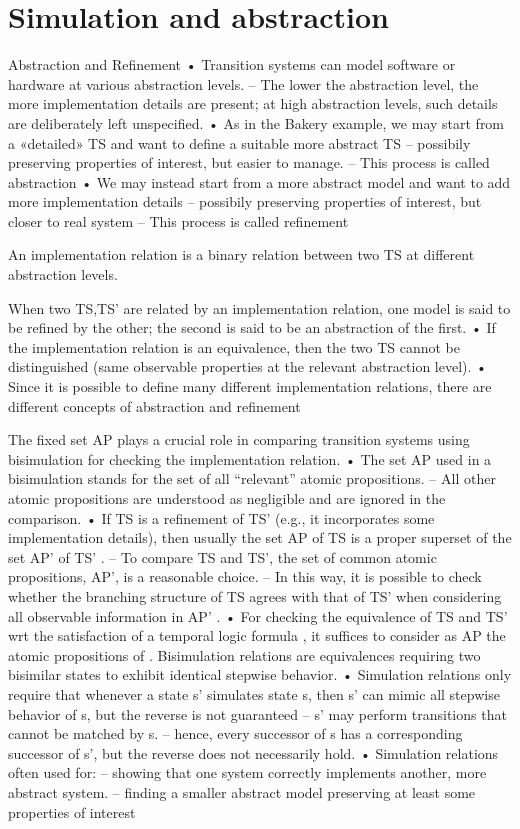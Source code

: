 \section{Simulation and abstraction}

Abstraction and Refinement
• Transition systems can model software or hardware at various abstraction levels.
– The lower the abstraction level, the more implementation details are present; at high
abstraction levels, such details are deliberately left unspecified.
• As in the Bakery example, we may start from a «detailed» TS and want to define
a suitable more abstract TS
– possibily preserving properties of interest, but easier to manage.
– This process is called abstraction
• We may instead start from a more abstract model and want to add more
implementation details
– possibily preserving properties of interest, but closer to real system
– This process is called refinement
\begin{definition}
    An implementation relation is a binary relation between two TS at different
abstraction levels. 
\end{definition}
\noindent When two TS,TS’ are related by an implementation relation, one model is said to
be refined by the other; the second is said to be an abstraction of the first.
• If the implementation relation is an equivalence, then the two TS cannot be
distinguished (same observable properties at the relevant abstraction level).
• Since it is possible to define many different implementation relations, there are
different concepts of abstraction and refinement

The fixed set AP plays a crucial role in comparing transition systems using
bisimulation for checking the implementation relation.
• The set AP used in a bisimulation stands for the set of all “relevant” atomic
propositions.
– All other atomic propositions are understood as negligible and are ignored in the comparison.
• If TS is a refinement of TS' (e.g., it incorporates some implementation details),
then usually the set AP of TS is a proper superset of the set AP' of TS' .
– To compare TS and TS’, the set of common atomic propositions, AP’, is a reasonable choice.
– In this way, it is possible to check whether the branching structure of TS agrees with that of
TS’ when considering all observable information in AP’ .
• For checking the equivalence of TS and TS' wrt the satisfaction of a temporal
logic formula \phi, it suffices to consider as AP the atomic propositions of \phi.
Bisimulation relations are equivalences requiring two bisimilar states to exhibit
identical stepwise behavior.
• Simulation relations only require that whenever a state s’ simulates state s, then
s’ can mimic all stepwise behavior of s, but the reverse is not guaranteed
– s’ may perform transitions that cannot be matched by s.
– hence, every successor of s has a corresponding successor of s’, but the reverse does
not necessarily hold.
• Simulation relations often used for:
– showing that one system correctly implements another, more abstract system.
– finding a smaller abstract model preserving at least some properties of interest

